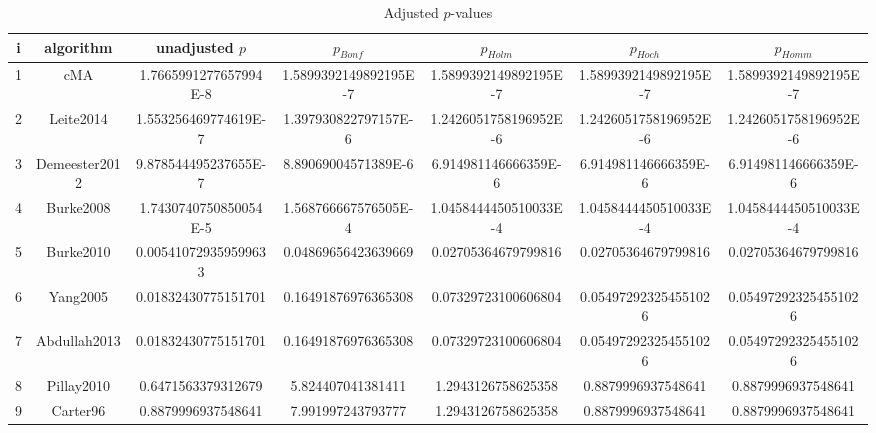\documentclass[a4paper,10pt]{article}
\begin{document}
\begin{landscape}
\begin{table}[!htp]
\centering\tiny
\caption{Adjusted $p$-values}
\begin{tabular}{ccccccc}
i&algorithm&unadjusted $p$&$p_{Bonf}$&$p_{Holm}$&$p_{Hoch}$&$p_{Homm}$\\
\hline
1&cMA&1.7665991277657994E-8&1.5899392149892195E-7&1.5899392149892195E-7&1.5899392149892195E-7&1.5899392149892195E-7\\
2&Leite2014&1.553256469774619E-7&1.397930822797157E-6&1.2426051758196952E-6&1.2426051758196952E-6&1.2426051758196952E-6\\
3&Demeester2012&9.878544495237655E-7&8.89069004571389E-6&6.914981146666359E-6&6.914981146666359E-6&6.914981146666359E-6\\
4&Burke2008&1.7430740750850054E-5&1.568766667576505E-4&1.0458444450510033E-4&1.0458444450510033E-4&1.0458444450510033E-4\\
5&Burke2010&0.005410729359599633&0.04869656423639669&0.02705364679799816&0.02705364679799816&0.02705364679799816\\
6&Yang2005&0.01832430775151701&0.16491876976365308&0.07329723100606804&0.054972923254551026&0.054972923254551026\\
7&Abdullah2013&0.01832430775151701&0.16491876976365308&0.07329723100606804&0.054972923254551026&0.054972923254551026\\
8&Pillay2010&0.6471563379312679&5.824407041381411&1.2943126758625358&0.8879996937548641&0.8879996937548641\\
9&Carter96&0.8879996937548641&7.991997243793777&1.2943126758625358&0.8879996937548641&0.8879996937548641\\
\hline
\end{tabular}
\end{table}


\end{landscape}
\end{document}
